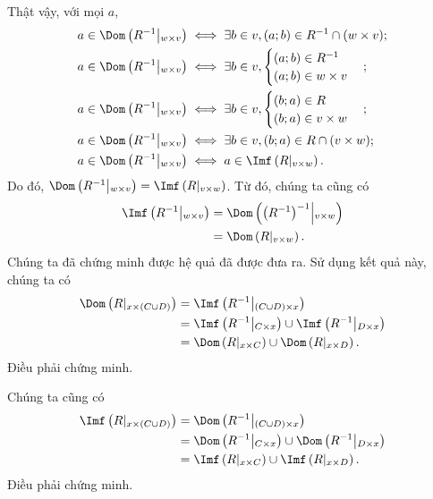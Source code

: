 Thật vậy, với mọi $a$, \begin{align*}
   a \in \Dom\left(R^{-1}\middle|_{w \times v}\right) &\iff \exists b \in v, (a; b) \in R^{-1} \cap (w \times v); \\
   a \in \Dom\left(R^{-1}\middle|_{w \times v}\right) &\iff \exists b \in v, \begin{cases}
      (a; b) \in R^{-1} \\
      (a; b) \in w \times v
   \end{cases}; \\
   a \in \Dom\left(R^{-1}\middle|_{w \times v}\right) &\iff \exists b \in v, \begin{cases}
      (b; a) \in R \\
      (b; a) \in v \times w
   \end{cases}; \\
   a \in \Dom\left(R^{-1}\middle|_{w \times v}\right) &\iff \exists b \in v, (b; a) \in R \cap (v \times w); \\
   a \in \Dom\left(R^{-1}\middle|_{w \times v}\right) &\iff a \in \Imf\left(R|_{v \times w}\right).
\end{align*}
Do đó, $\Dom\left(R^{-1}\middle|_{w \times v}\right) = \Imf\left(R|_{v \times w}\right)$. Từ đó, chúng ta cũng có \begin{align*}
   \Imf\left(R^{-1}\middle|_{w \times v}\right) &= \Dom\left(\left(R^{-1}\right)^{-1}\middle|_{v \times w}\right) \\
   &= \Dom\left(R|_{v \times w}\right).
\end{align*}
Chúng ta đã chứng minh được hệ quả đã được đưa ra. Sử dụng kết quả này, chúng ta có
\begin{align*}
   \Dom\left(R|_{x \times (C \cup D)}\right) &= \Imf\left(R^{-1}\middle|_{(C \cup D) \times x}\right) \\
   &= \Imf\left(R^{-1}\middle|_{C \times x}\right) \cup \Imf\left(R^{-1}\middle|_{D \times x}\right) \\
   &= \Dom\left(R|_{x \times C}\right) \cup \Dom\left(R|_{x \times D}\right).
\end{align*}
Điều phải chứng minh.

\stepSubexercise Chúng ta cũng có \begin{align*}
   \Imf\left(R|_{x \times (C \cup D)}\right) &= \Dom\left(R^{-1}\middle|_{(C \cup D) \times x}\right) \\
   &= \Dom\left(R^{-1}\middle|_{C \times x}\right) \cup \Dom\left(R^{-1}\middle|_{D \times x}\right) \\
   &= \Imf\left(R|_{x \times C}\right) \cup \Imf\left(R|_{x \times D}\right).
\end{align*}
Điều phải chứng minh.

